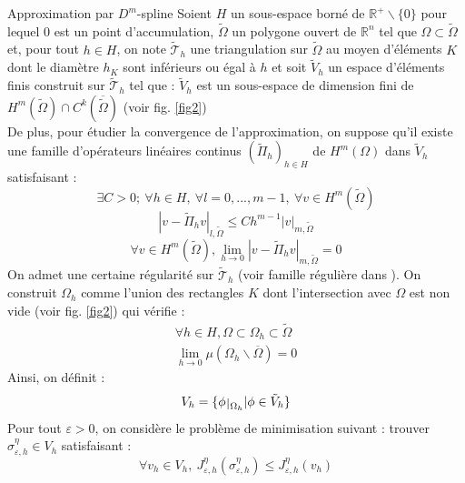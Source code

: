 \documentclass[final]{beamer}
\def\restriction#1#2{\mathchoice
              {\setbox1\hbox{${\displaystyle #1}_{\scriptstyle #2}$}
              \restrictionaux{#1}{#2}}
              {\setbox1\hbox{${\textstyle #1}_{\scriptstyle #2}$}
              \restrictionaux{#1}{#2}}
              {\setbox1\hbox{${\scriptstyle #1}_{\scriptscriptstyle #2}$}
              \restrictionaux{#1}{#2}}
              {\setbox1\hbox{${\scriptscriptstyle #1}_{\scriptscriptstyle #2}$}
              \restrictionaux{#1}{#2}}}
\def\restrictionaux#1#2{{#1\,\smash{\vrule height .8\ht1 depth .85\dp1}}_{\,#2}}
\newlength{\onecolwid}
\begin{document}
\begin{frame}[t]
\begin{columns}[t]
\begin{column}{\onecolwid}
\begin{block}{Approximation par $D^m$-spline}
Soient $H$ un sous-espace borné de $\mathbb{R}^+\backslash\{0\}$ pour lequel $0$ est un point d'accumulation, $\tilde{\Omega}$ un polygone ouvert de $\mathbb{R}^n$ tel que $\Omega\subset\tilde{\Omega}$ et, pour tout $h\in H$, on note $\tilde{\mathscr{T}}_h$ une triangulation sur $\tilde{\Omega}$ au moyen d'éléments $K$ dont le diamètre $h_K$ sont inférieurs ou égal à $h$ et soit $\tilde{V}_h$ un espace d'éléments finis construit sur $\tilde{\mathscr{T}}_h$ tel que : $\tilde{V}_h$ est un sous-espace de dimension fini de $H^m\left(\tilde{\Omega}\right)\cap C^k\left(\overline{\tilde{\Omega}}\right)$ (voir fig. \ref{fig2})\\
De plus, pour étudier la convergence de l'approximation, on suppose qu'il existe une famille d'opérateurs linéaires continus $(\tilde{\Pi}_h)_{h\in H}$ de $H^m(\Omega)$ dans $\tilde{V}_h$ satisfaisant :
	\[\exists C>0;\ \forall h\in H,\ \forall l=0,...,m-1,\ \forall v\in H^m(\tilde{\Omega})\]
\begin{equation} \label{eq6.1}
\left| v-\tilde{\Pi}_h v\right|_{l,\tilde{\Omega}}\leq Ch^{m-1}|v|_{m,\tilde{\Omega}}
\end{equation}
\begin{equation} \label{eq6.2}
	\forall v\in H^m(\tilde{\Omega}), \lim_{h\to 0} \left|v-\tilde{\Pi}_h v \right|_{m,\tilde{\Omega}}=0
\end{equation}
On admet une certaine régularité sur $\tilde{\mathscr{T}}_h$ (voir famille régulière dans \cite{ciarlet72gal}). On construit $\Omega_h$ comme l'union des rectangles $K$ dont l'intersection avec $\Omega$ est non vide (voir fig. \ref{fig2}) qui vérifie : 
\begin{eqnarray}
	\label{eq9} \forall h\in H, \Omega\subset\Omega_h\subset\tilde{\Omega}\\
	\label{eq10} \lim_{h\to 0} \mu(\Omega_h\backslash\overline{\Omega})=0
\end{eqnarray}
Ainsi, on définit :
	\begin{equation}\label{eq11} V_h=\{\restriction{\phi}{\Omega_h}| \phi\in\tilde{V}_h\}\end{equation}
Pour tout $\varepsilon>0$, on considère le problème de minimisation suivant : trouver $\sigma_{\varepsilon,h}^\eta\in V_h$ satisfaisant :
	\begin{equation} \label{eq12} \forall v_h\in V_h,\ J_{\varepsilon, h}^\eta (\sigma_{\varepsilon, h}^\eta)\leq J_{\varepsilon, h}^\eta (v_h) \end{equation}

\end{block}
\end{column}
\end{columns}
\end{frame}
\end{document}
